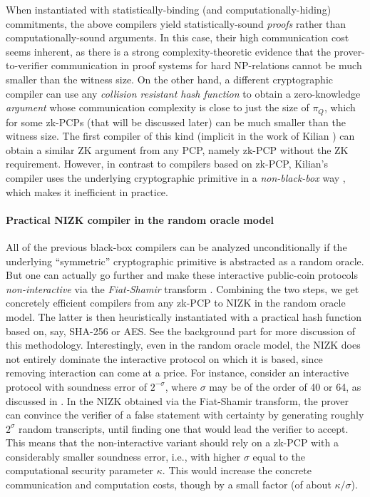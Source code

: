 When instantiated with statistically-binding (and computationally-hiding) commitments, the above compilers yield statistically-sound {\em proofs} rather than computationally-sound arguments. 
In this case, their high communication cost seems inherent, as there is a strong complexity-theoretic evidence \cite{1996:GH:complexity,2002:GVW:IP-laconic-prover} that the prover-to-verifier communication in proof systems for hard NP-relations cannot be much smaller than the witness size.
On the other hand, a different cryptographic compiler \cite{2015:IMSX:on-ZK-PCPs} can use any {\em collision resistant hash function} to obtain a zero-knowledge {\em argument} whose communication complexity is close to just the size of $\pi_Q$, which for some zk-PCPs (that will be discussed later) can be much smaller than the witness size. 
The first compiler of this kind (implicit in the work of Kilian \cite{1992:kilian:note-on-efficient-ZKPs-and-args}) can obtain a similar ZK argument from any PCP, namely zk-PCP without the ZK requirement.
However, in contrast to compilers based on zk-PCP, Kilian's compiler uses the underlying cryptographic primitive in a {\em non-black-box} way \cite{2004:RTV:notions-of-reducibility}, which makes it inefficient in practice.
\loosen


\paragraph{Practical NIZK compiler in the random oracle model}
All of the previous black-box compilers can be analyzed unconditionally if the underlying ``symmetric'' cryptographic primitive is abstracted as a random oracle.  
But one can actually go further and make these interactive public-coin protocols {\em non-interactive}  via the {\em Fiat-Shamir} transform \cite{1987:FS:crypto:How-To-Prove-Yourself}. 
Combining the two steps, we get concretely efficient compilers from any zk-PCP to NIZK in the random oracle model. 
The latter is then heuristically instantiated with a practical hash function based on, say, SHA-256 or AES. 
See the background part for more discussion of this methodology. 
Interestingly, even in the random oracle model, the NIZK does not entirely dominate the interactive protocol on which it is based, since removing interaction can come at a price. 
For instance, consider an interactive protocol with soundness error of $2^{-\sigma}$, where $\sigma$ may be of the order of 40 or 64, as discussed in .
In the NIZK obtained via the Fiat-Shamir transform, the prover can convince the verifier of a false statement with certainty by generating roughly $2^{\sigma}$ random transcripts, until finding one that would lead the verifier to accept. 
This means that the non-interactive variant should rely on a zk-PCP with a considerably smaller soundness error, i.e., with higher $\sigma$ equal to the computational security parameter $\kappa$. 
This would increase the concrete communication and computation costs, though by a small factor (of about $\kappa/\sigma$). 


